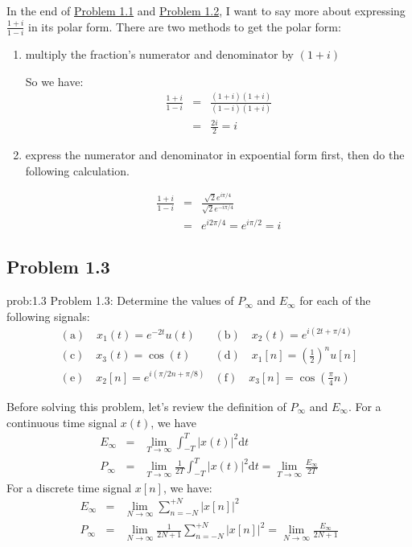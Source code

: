\documentclass[koma,a4paper,utopia,12pt,listings-color,microtype,paralist,colorlinks,urlcolor=red]{org-article}
\begin{document}
In the end of \hyperref[prob11]{Problem 1.1} and \hyperref[prob12]{Problem 1.2}, I want to say
more about expressing \(\tfrac{1+i}{1-i}\) in its polar form. There are two
methods to get the polar form:
\begin{enumerate}
\item multiply the fraction's numerator and denominator by \(( 1 + i )\)

So we have:
\begin{eqnarray*}
\frac{1+i}{1-i}& = & \frac{(1+i)(1+i)}{(1-i)(1+i)} \\
&=& \frac{2i}{2} = i
\end{eqnarray*}

\item express the numerator and denominator in expoential form first, then do the
following calculation.

\begin{eqnarray*}
\frac{1+i}{1-i} &=& \frac{\sqrt{2}e^{i\pi/4}}{\sqrt{2}e^{-i\pi/4}}  \\
&=& e^{i2\pi/4} = e^{i\pi/2} = i
\end{eqnarray*}
\end{enumerate}
\subsection{Problem 1.3}
\label{sec:orge16e8d1}


\begin{prob}[]{prob:1.3}
Problem 1.3: Determine the values of \(P_{\infty}\) and \(E_{\infty}\) for each
of the following signals:
\begin{equation*}
\begin{array}{ll}
\mathrm{(a)} \quad x_{1}(t) = e^{-2t}u(t) & \mathrm{(b)} \quad x_{2}(t) = e^{i(2t + \pi/4)} \\
 \mathrm{(c)} \quad x_{3}(t) = \cos(t) & \mathrm{(d)} \quad x_{1}[n] = (\tfrac{1}{2})^{n} u[n] \\
 \mathrm{( e )} \quad x_{2}[n] = e^{i(\pi/2n + \pi/8)} & \mathrm{(f)} \quad x_{3}[n] = \cos(\tfrac{\pi}{4}n)
\end{array}
\end{equation*}
\label{prob13}
\end{prob}

Before solving this problem, let's review the definition of \(P_{\infty}\) and
\(E_{\infty}\). For a continuous time signal \(x(t)\), we have
\begin{eqnarray}
\label{eq:2}
E_{\infty}&=& \lim_{T\to \infty} \int_{-T}^{T} |x(t)|^{2}\mathrm{d}t \\
P_{\infty}&=& \lim_{T\to \infty} \frac{1}{2T}\int_{-T}^{T} |x(t)|^{2}\mathrm{d}t = \lim_{T\to\infty} \frac{E_{\infty}}{2T}
\end{eqnarray}
For a discrete time signal \(x[n]\), we have:
\begin{eqnarray}
\label{eq:3}
E_{\infty}&=& \lim_{N\to \infty} \sum_{n=-N}^{+N} |x[n]|^{2} \\
P_{\infty}&=& \lim_{N\to \infty} \frac{1}{2N+1} \sum_{n=-N}^{+N} |x[n]|^{2} = \lim_{N\to\infty} \frac{E_{\infty}}{2N+1}
\end{eqnarray}
\end{document}
